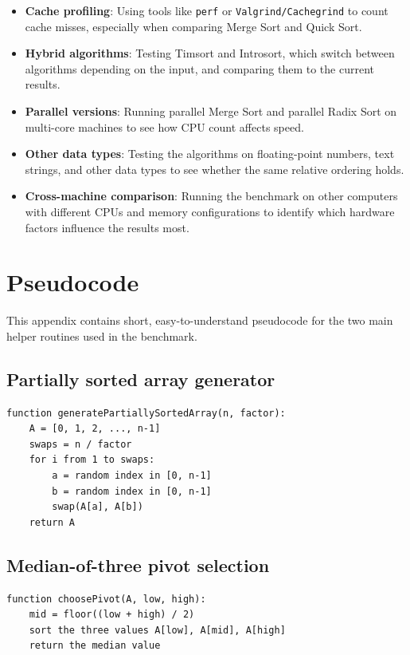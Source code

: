 \documentclass[12pt,a4paper]{article}
\theoremstyle{definition}
\begin{document}
\begin{itemize}[noitemsep]
  \item \textbf{Cache profiling}: Using tools like \texttt{perf} or \texttt{Valgrind/Cachegrind} to count cache misses, especially when comparing Merge Sort and Quick Sort.
  \item \textbf{Hybrid algorithms}: Testing Timsort and Introsort, which switch between algorithms depending on the input, and comparing them to the current results.
  \item \textbf{Parallel versions}: Running parallel Merge Sort and parallel Radix Sort on multi-core machines to see how CPU count affects speed.
  \item \textbf{Other data types}: Testing the algorithms on floating-point numbers, text strings, and other data types to see whether the same relative ordering holds.
  \item \textbf{Cross-machine comparison}: Running the benchmark on other computers with different CPUs and memory configurations to identify which hardware factors influence the results most.
\end{itemize}

\label{sec:bibliography}




\appendix
\section{Pseudocode}
\label{app:pseudocode}

This appendix contains short, easy-to-understand pseudocode for the two main helper routines used in the benchmark.
\clearpage
\subsection{Partially sorted array generator}
\begin{lstlisting}[basicstyle=\ttfamily\small]
function generatePartiallySortedArray(n, factor):
    A = [0, 1, 2, ..., n-1]
    swaps = n / factor
    for i from 1 to swaps:
        a = random index in [0, n-1]
        b = random index in [0, n-1]
        swap(A[a], A[b])
    return A
\end{lstlisting}

\subsection{Median-of-three pivot selection}
\begin{lstlisting}[basicstyle=\ttfamily\small]
function choosePivot(A, low, high):
    mid = floor((low + high) / 2)
    sort the three values A[low], A[mid], A[high]
    return the median value
\end{lstlisting}
\end{document}
